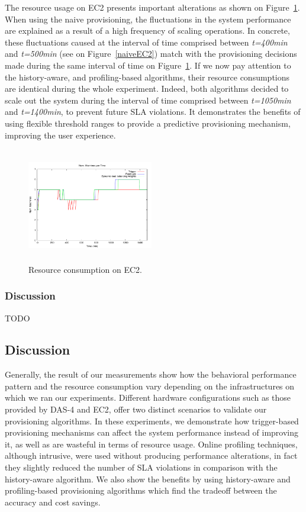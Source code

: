 The resource usage on EC2 presents important alterations as shown on Figure~\ref{resEC2}. When using the naive provisioning, the fluctuations in the system performance are explained as a result of a high frequency of scaling operations. In concrete, these fluctuations caused at the interval of time comprised between \emph{t=400min} and \emph{t=500min} (see on Figure~\ref{naiveEC2}) match with the provisioning decisions made during the same interval of time on Figure~\ref{resEC2}. If we now pay attention to the history-aware, and profiling-based algorithms, their resource consumptions are identical during the whole experiment. Indeed, both algorithms decided to scale out the system during the interval of time comprised between \emph{t=1050min} and \emph{t=1400min}, to prevent future SLA violations. It demonstrates the benefits of using flexible threshold ranges to provide a predictive provisioning mechanism, improving the user experience.


\begin{figure}
\begin{center}
\includegraphics[width=0.49\textwidth, height=5cm]{./images/heterogeneous/numMachinesCompEC2}
\end{center}
\caption{Resource consumption on EC2.}
\label{resEC2}
\end{figure}


\subsubsection{Discussion}

TODO

\subsection{Discussion}



Generally, the result of our measurements show how the behavioral performance pattern and the resource consumption vary depending on the infrastructures on which we ran our experiments. Different hardware configurations such as those provided by DAS-4 and EC2, offer two distinct scenarios to validate our provisioning algorithms.  In these experiments, we demonstrate how trigger-based provisioning mechanisms can affect the system performance instead of improving it, as well as are wasteful in terms of resource usage. Online profiling techniques, although intrusive, were used without producing performance alterations, in fact they slightly reduced the number of SLA violations in comparison with the history-aware algorithm. We also show the benefits by using history-aware and profiling-based provisioning algorithms which find the tradeoff between the accuracy and cost savings. 

